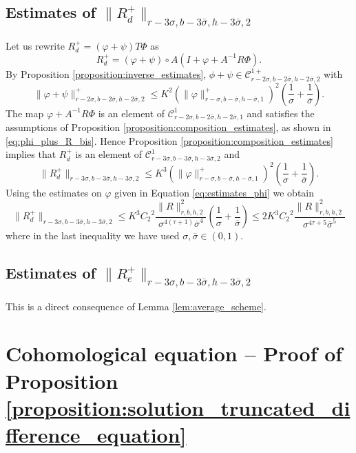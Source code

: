 \documentclass[10pt]{article}
\begin{document}
\subsection{Estimates of $\|R_d^+\|_{r-3\sigma,b-3\overline\sigma,h-3\overline\sigma,2}$} Let us rewrite $R_d^+=(\varphi + \psi)T \Phi$ as
\[
R_d^+ = (\varphi+\psi)\circ A(I+\varphi+A^{-1}R\Phi).
\]
By Proposition \ref{proposition:inverse_estimates}, $\phi+\psi\in\mathscr C^{1+}_{r-2\sigma,b-2\overline\sigma,h-2\overline\sigma,2}$ with
 \[
 \|\varphi+\psi\|_{r-2\sigma,b-2\overline\sigma,h-2\overline\sigma,2}^+ 
 \leq 
 K^2({\|\varphi\|_{r-\sigma,b-\overline\sigma,h-\overline\sigma,1}^+})^2
 \left(\frac{1}{\sigma}+\frac{1}{\overline\sigma}\right).
 \]
The map $\varphi+A^{-1}R\Phi$ is an element of $\mathscr C^1_{r-2\sigma,b-2\overline\sigma,h-2\overline\sigma,1}$ and
satisfies the assumptions of 
Proposition \ref{proposition:composition_estimates},
as shown in \eqref{eq:phi_plus_R_bis}.
Hence Proposition \ref{proposition:composition_estimates} implies that $R_d^+$ is an element of $\mathscr C^1_{r-3\sigma,b-3\overline\sigma,h-3\overline\sigma,2}$ and
\[
 \|R_d^+\|_{r-3\sigma,b-3\overline\sigma,h-3\overline\sigma,2} \leq K^3({\|\varphi\|_{r-\sigma,b-\overline\sigma,h-\overline\sigma,1}^+})^2\left(\frac{1}{\sigma}+\frac{1}{\overline\sigma}\right).
\]
Using the estimates on $\varphi$ given in Equation \eqref{eq:estimates_phi} we obtain
\[
\|R_d^+\|_{r-3\sigma,b-3\overline\sigma,h-3\overline\sigma,2} 
\leq K^3{C_2}^2
\frac{\|R\|_{r,b,h,2}^2}{\sigma^{4(\tau+1)}\overline\sigma^4}
\left(
 \frac{1}{\sigma}
 +
 \frac{1}{\overline\sigma}\right)
 \leq 
 2K^3{C_2}^2
\frac{\|R\|_{r,b,h,2}^2}{\sigma^{4\tau+5}\overline\sigma^5}
\]
where in the last inequality we have used $\sigma,\overline\sigma\in(0,1)$.

\subsection{Estimates of $\|R_e^+\|_{r-3\sigma,b-3\overline\sigma,h-3\overline\sigma,2}$}

This is a direct consequence of Lemma \ref{lem:average_scheme}. 


\section{Cohomological equation -- Proof of Proposition \ref{proposition:solution_truncated_difference_equation}}
\label{section:proof_cohomological_equation}
\end{document}
